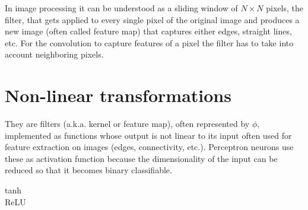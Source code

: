 In image processing it can be understood as a sliding window of ${N}\times{N}$ pixels, the filter, that gets applied to every single pixel of the original image and produces a new image (often called feature map) that captures either edges, straight lines, etc.
For the convolution to capture features of a pixel the filter has to take into account neighboring pixels.





\section{Non-linear transformations}
\label{sec:Non-linear transformations}

They are filters (a.k.a. kernel or feature map), often represented by $\phi$, implemented as functions whose output is not linear to its input often used for feature extraction on images (edges, connectivity, etc.). Perceptron neurons use these as activation function because the dimensionality of the input can be reduced so that it becomes binary classifiable.

\begin{description}
  \item[tanh]
  \item[ReLU]
\end{description}

